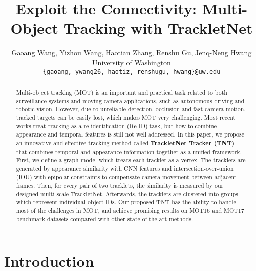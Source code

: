\documentclass[10pt,twocolumn,letterpaper]{article}
\begin{document}
\title{Exploit the Connectivity: Multi-Object Tracking with TrackletNet}

\author{Gaoang Wang, Yizhou Wang, Haotian Zhang, Renshu Gu, Jenq-Neng Hwang \vspace{0.5em}\\ 
University of Washington\\
{\tt\small \{gaoang, ywang26, haotiz, renshugu, hwang\}@uw.edu}
}

\maketitle


\begin{abstract}
Multi-object tracking (MOT) is an important and practical task related to both surveillance systems and moving camera applications, such as autonomous driving and robotic vision. However, due to unreliable detection, occlusion and fast camera motion, tracked targets can be easily lost, which makes MOT very challenging. Most recent works treat tracking as a re-identification (Re-ID) task, but how to combine appearance and temporal features is still not well addressed. 
In this paper, we propose an innovative and effective tracking method called 
\textbf{TrackletNet Tracker (TNT)} that combines temporal and appearance information together as a unified framework. First, we define a graph model which treats each tracklet as a vertex. The tracklets are generated by appearance similarity with CNN features and intersection-over-union (IOU) 
with epipolar constraints to compensate camera movement between adjacent frames. Then, for every pair of two tracklets, the similarity is measured by our designed multi-scale TrackletNet. Afterwards, the tracklets are clustered \cite{tang2018single} into groups which represent individual object IDs. Our proposed TNT has the ability to handle most of the challenges in MOT, and achieve promising results on MOT16 and MOT17 benchmark datasets compared with other state-of-the-art methods.
\end{abstract}



\section{Introduction}
\end{document}
